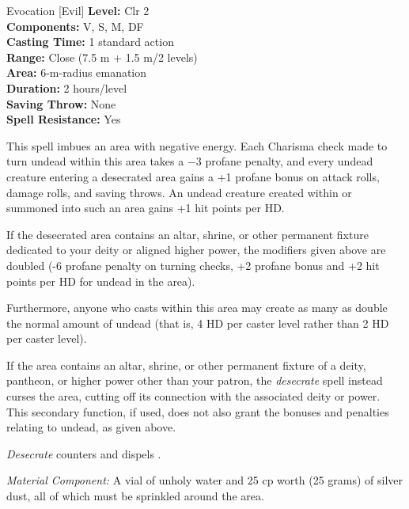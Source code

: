 {Evocation [Evil]}
{
	\textbf{Level:}
	Clr 2\\
	\textbf{Components:}
	V, S, M, DF\\
	\textbf{Casting Time:}
	1 standard action\\
	\textbf{Range:}
	Close (7.5 m + 1.5 m/2 levels)\\
	\textbf{Area:}
	6-m-radius emanation\\
	\textbf{Duration:}
	2 hours/level\\
	\textbf{Saving Throw:}
	None\\
	\textbf{Spell Resistance:}
	Yes\\
}
{
	This spell imbues an area with negative energy. Each Charisma check made to turn undead within this area takes a $-3$ profane penalty, and every undead creature entering a desecrated area gains a +1 profane bonus on attack rolls, damage rolls, and saving throws. An undead creature created within or summoned into such an area gains +1 hit points per HD.

	If the desecrated area contains an altar, shrine, or other permanent fixture dedicated to your deity or aligned higher power, the modifiers given above are doubled (-6 profane penalty on turning checks, +2 profane bonus and +2 hit points per HD for undead in the area).

	Furthermore, anyone who casts  within this area may create as many as double the normal amount of undead (that is, 4 HD per caster level rather than 2 HD per caster level).

	If the area contains an altar, shrine, or other permanent fixture of a deity, pantheon, or higher power other than your patron, the \emph{desecrate} spell instead curses the area, cutting off its connection with the associated deity or power. This secondary function, if used, does not also grant the bonuses and penalties relating to undead, as given above.

	\emph{Desecrate} counters and dispels .

	\textit{Material Component:}
	A vial of unholy water and 25 cp worth (25 grams) of silver dust, all of which must be sprinkled around the area.

}
